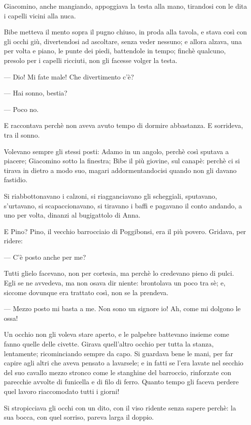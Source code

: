 Giacomino, anche mangiando, appoggiava la testa alla mano, tirandosi con le dita i capelli vicini alla nuca.

Bibe metteva il mento sopra il pugno chiuso, in proda alla tavola, e stava così con gli occhi giù, divertendosi ad ascoltare, senza veder nessuno; e allora alzava, una per volta e piano, le punte dei piedi, battendole in tempo; finchè qualcuno, presolo per i capelli ricciuti, non gli facesse volger la testa.

— Dio! Mi fate male! Che divertimento c’è?

— Hai sonno, bestia?

— Poco no.

E raccontava perchè non aveva avuto tempo di dormire abbastanza. E sorrideva, tra il sonno.

Volevano sempre gli stessi posti: Adamo in un angolo, perchè così sputava a piacere; Giacomino sotto la finestra; Bibe il più giovine, sul canapè: perchè ci si tirava in dietro a modo suo, magari addormentandocisi quando non gli davano fastidio.

Si riabbottonavano i calzoni, si riagganciavano gli scheggiali, sputavano, s’urtavano, si scapaccionavano, si tiravano i baffi e pagavano il conto andando, a uno per volta, dinanzi al bugigattolo di Anna.

E Pino? Pino, il vecchio barrocciaio di Poggibonsi, era il più povero. Gridava, per ridere:

— C’è posto anche per me?

Tutti glielo facevano, non per cortesia, ma perchè lo credevano pieno di pulci. Egli se ne avvedeva, ma non osava dir niente: brontolava un poco tra sè; e, siccome dovunque era trattato così, non se la prendeva.

— Mezzo posto mi basta a me. Non sono un signore io! Ah, come mi dolgono le ossa!

Un occhio non gli voleva stare aperto, e le palpebre battevano insieme come fanno quelle delle civette. Girava quell’altro occhio per tutta la stanza, lentamente; ricominciando sempre da capo. Si guardava bene le mani, per far capire agli altri che aveva pensato a lavarsele; e in fatti se l’era lavate nel secchio del suo cavallo mezzo stronco come le stanghine del barroccio, rinforzate con parecchie avvolte di funicella e di filo di ferro. Quanto tempo gli faceva perdere quel lavoro riaccomodato tutti i giorni!

Si stropicciava gli occhi con un dito, con il viso ridente senza sapere perchè: la sua bocca, con quel sorriso, pareva larga il doppio.

